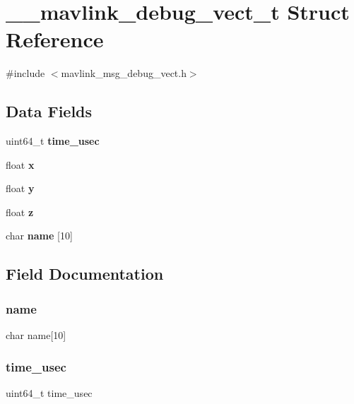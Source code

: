 \section{\+\_\+\+\_\+mavlink\+\_\+debug\+\_\+vect\+\_\+t Struct Reference}
\label{struct____mavlink__debug__vect__t}


{\ttfamily \#include $<$mavlink\+\_\+msg\+\_\+debug\+\_\+vect.\+h$>$}

\subsection*{Data Fields}
\begin{DoxyCompactItemize}
\item 
uint64\+\_\+t \textbf{ time\+\_\+usec}
\item 
float \textbf{ x}
\item 
float \textbf{ y}
\item 
float \textbf{ z}
\item 
char \textbf{ name} [10]
\end{DoxyCompactItemize}


\subsection{Field Documentation}
\mbox{\label{struct____mavlink__debug__vect__t_a38db771080a5bca533de0f0236ff11ec}} 
\subsubsection{name}
{\footnotesize\ttfamily char name[10]}

\mbox{\label{struct____mavlink__debug__vect__t_a2db60704c293664dcb6159b55c98c2f2}} 
\subsubsection{time\+\_\+usec}
{\footnotesize\ttfamily uint64\+\_\+t time\+\_\+usec}

